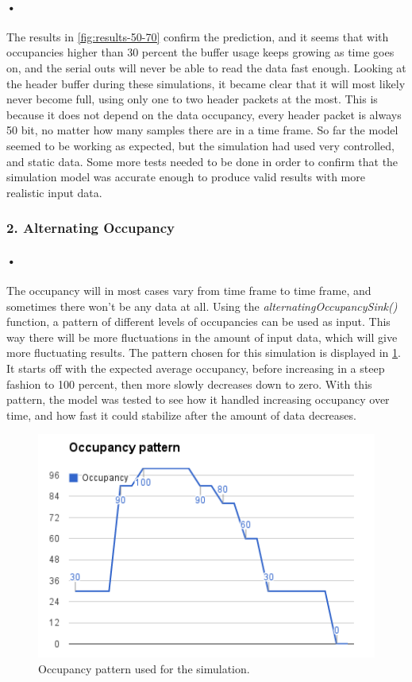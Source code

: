 \documentclass[a4paper, 12pt]{report}
\begin{document}
\paragraph{•} %
The results in \ref{fig:results-50-70} confirm the prediction, and it seems that with occupancies higher than 30 percent the buffer usage keeps growing as time goes on, and the serial outs will never be able to read the data fast enough.
Looking at the header buffer during these simulations, it became clear that it will most likely never become full, using only one to two header packets at the most.
This is because it does not depend on the data occupancy, every header packet is always 50 bit, no matter how many samples there are in a time frame.
So far the model seemed to be working as expected, but the simulation had used very controlled, and static data.
Some more tests needed to be done in order to confirm that the simulation model was accurate enough to produce valid results with more realistic input data.

\subsubsection{2. Alternating Occupancy}

\paragraph{•} %
The occupancy will in most cases vary from time frame to time frame, and sometimes there won't be any data at all.
Using the \textit{alternatingOccupancySink()} function, a pattern of different levels of occupancies can be used as input.
This way there will be more fluctuations in the amount of input data, which will give more fluctuating results.
The pattern chosen for this simulation is displayed in \ref{fig:occ-pattern}.
It starts off with the expected average occupancy, before increasing in a steep fashion to 100 percent, then more slowly decreases down to zero.
With this pattern, the model was tested to see how it handled increasing occupancy over time, and how fast it could stabilize after the amount of data decreases.

\begin{figure}[h!]
	\centering
		\includegraphics[width=1.0\textwidth]{images/occ-pattern.png}
		\caption{Occupancy pattern used for the simulation.}
		\label{fig:occ-pattern}
\end{figure}
\end{document}
